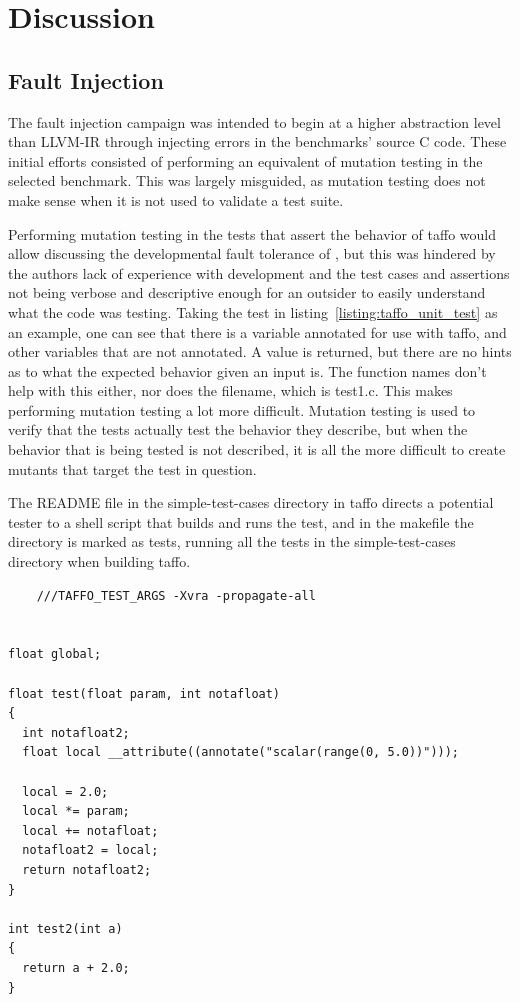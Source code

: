 \section{Discussion}

\subsection{Fault Injection}

The fault injection campaign was intended to begin at a higher abstraction level than LLVM-IR through injecting errors in the benchmarks' source C code. These initial efforts consisted of performing an equivalent of mutation testing in the selected benchmark. This was largely misguided, as mutation testing does not make sense when it is not used to validate a test suite. 

Performing mutation testing in the tests that assert the behavior of taffo would allow discussing the developmental fault tolerance of \taffo{}, but this was hindered by the authors lack of experience with \taffo{} development and the test cases and assertions not being verbose and descriptive enough for an outsider to easily understand what the code was testing. Taking the test in listing~\ref{listing:taffo_unit_test} as an example, one can see that there is a variable annotated for use with taffo, and other variables that are not annotated. A value is returned, but there are no hints as to what the expected behavior given an input is. The function names don't help with this either, nor does the filename, which is test1.c. This makes performing mutation testing a lot more difficult. Mutation testing is used to verify that the tests actually test the behavior they describe, but when the behavior that is being tested is not described, it is all the more difficult to create mutants that target the test in question.

The README file in the simple-test-cases directory in taffo directs a potential tester to a shell script that builds and runs the test, and in the makefile the directory is marked as tests, running all the tests in the simple-test-cases directory when building taffo.

\begin{lstlisting}
    ///TAFFO_TEST_ARGS -Xvra -propagate-all


float global;

float test(float param, int notafloat)
{
  int notafloat2;
  float local __attribute((annotate("scalar(range(0, 5.0))")));
  
  local = 2.0;
  local *= param;
  local += notafloat;
  notafloat2 = local;
  return notafloat2;
}

int test2(int a)
{
  return a + 2.0;
}

\end{lstlisting}

